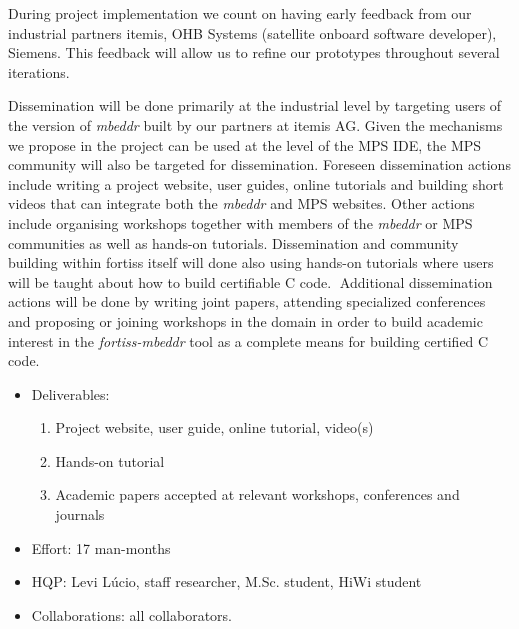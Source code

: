 During project implementation we count on having early feedback from our
industrial partners itemis, OHB Systems (satellite onboard software developer),
Siemens. This feedback will allow us to refine our prototypes throughout
several iterations.

Dissemination will be done primarily at the industrial level by targeting users
of the version of \emph{mbeddr} built by our partners at itemis AG. Given the
mechanisms we propose in the project can be used at the level of the MPS IDE,
the MPS community will also be targeted for dissemination. Foreseen
dissemination actions include writing a project website, user guides, online
tutorials and building short videos that can integrate both the \emph{mbeddr} and MPS
websites. Other actions include organising workshops together with members of
the \emph{mbeddr} or MPS communities as well as hands-on tutorials.
Dissemination and community building within fortiss itself will done also using
hands-on tutorials where users will be taught about how to build certifiable C
code.􏰁 Additional dissemination actions will be done by writing joint papers,
attending specialized conferences and proposing or joining workshops in the
domain in order to build academic interest in the \emph{fortiss-mbeddr} tool as
a complete means for building certified C code.

\begin{itemize}
  \item Deliverables:
  \begin{enumerate}
    \item Project website, user guide, online tutorial, video(s)
	\item Hands-on tutorial
	\item Academic papers accepted at relevant workshops, conferences and journals
  \end{enumerate}
  \item Effort: 17 man-months
  \item HQP: Levi L\'ucio, staff researcher, M.Sc. student, HiWi student 
  \item Collaborations: all collaborators.
\end{itemize}